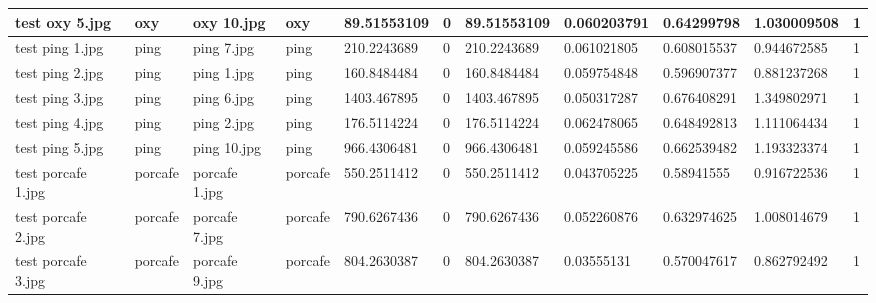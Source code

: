 \begin{landscape}
\begin{longtable}{|p{2cm}|p{1.5cm}|p{2cm}|p{1.5cm}|p{2cm}|p{1cm}|p{2cm}|p{2cm}|p{2cm}|p{2cm}|p{1cm}|}
		test oxy 5.jpg       & oxy              & oxy 10.jpg            & oxy                         & 89.51553109           & 0                       & 89.51553109                & 0.060203791           & 0.64299798            & 1.030009508              & 1                \\ \hline
		test ping 1.jpg      & ping             & ping 7.jpg            & ping                        & 210.2243689           & 0                       & 210.2243689                & 0.061021805           & 0.608015537           & 0.944672585              & 1                \\ \hline
		test ping 2.jpg      & ping             & ping 1.jpg            & ping                        & 160.8484484           & 0                       & 160.8484484                & 0.059754848           & 0.596907377           & 0.881237268              & 1                \\ \hline
		test ping 3.jpg      & ping             & ping 6.jpg            & ping                        & 1403.467895           & 0                       & 1403.467895                & 0.050317287           & 0.676408291           & 1.349802971              & 1                \\ \hline
		test ping 4.jpg      & ping             & ping 2.jpg            & ping                        & 176.5114224           & 0                       & 176.5114224                & 0.062478065           & 0.648492813           & 1.111064434              & 1                \\ \hline
		test ping 5.jpg      & ping             & ping 10.jpg           & ping                        & 966.4306481           & 0                       & 966.4306481                & 0.059245586           & 0.662539482           & 1.193323374              & 1                \\ \hline
		test porcafe 1.jpg   & porcafe          & porcafe 1.jpg         & porcafe                     & 550.2511412           & 0                       & 550.2511412                & 0.043705225           & 0.58941555            & 0.916722536              & 1                \\ \hline
		test porcafe 2.jpg   & porcafe          & porcafe 7.jpg         & porcafe                     & 790.6267436           & 0                       & 790.6267436                & 0.052260876           & 0.632974625           & 1.008014679              & 1                \\ \hline
		test porcafe 3.jpg   & porcafe          & porcafe 9.jpg         & porcafe                     & 804.2630387           & 0                       & 804.2630387                & 0.03555131            & 0.570047617           & 0.862792492              & 1                \\ \hline

\end{longtable}
\end{landscape}
